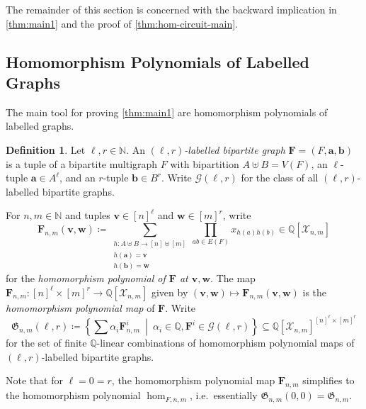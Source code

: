 \documentclass[11pt, DIV=15]{scrarticle}
\theoremstyle{definition}
\newtheorem{definition}{Definition}[section]
\theoremstyle{plain}
\theoremstyle{remark}
\begin{document}
	The remainder of this section is concerned with the backward implication in \cref{thm:main1} and the proof of \cref{thm:hom-circuit-main}.
	
	
	


	
	\subsection{Homomorphism Polynomials of Labelled Graphs}

	The main tool for proving \cref{thm:main1} are homomorphism polynomials of labelled graphs.
		
	\begin{definition}\label{def:labelled-hom-poly}
		Let $\ell, r \in \mathbb{N}$.
		An \emph{$(\ell, r)$-labelled bipartite graph} $\boldsymbol{F} = (F, \boldsymbol{a}, \boldsymbol{b})$ is a tuple of a bipartite multigraph $F$ with bipartition $A \uplus B = V(F)$,
		an $\ell$-tuple $\boldsymbol{a} \in A^\ell$, and an $r$-tuple $\boldsymbol{b} \in B^r$.
		Write $\mathcal{G}(\ell, r)$ for the class of all $(\ell, r)$-labelled bipartite graphs.
		
		For $n, m \in \mathbb{N}$ and tuples $\boldsymbol{v} \in [n]^\ell$ and $\boldsymbol{w} \in [m]^r$, write
		\[
		\boldsymbol{F}_{n,m}(\boldsymbol{v}, \boldsymbol{w}) \coloneqq \sum_{\substack{h \colon A \uplus B \to [n] \uplus [m]\\ h(\boldsymbol{a}) = \boldsymbol{v} \\ h(\boldsymbol{b}) = \boldsymbol{w}}} \prod_{ab \in E(F)} x_{h(a)h(b)} \in \mathbb{Q}[\mathcal{X}_{n,m}]
		\]
		for the \emph{homomorphism polynomial of $\boldsymbol{F}$ at $\boldsymbol{v},  \boldsymbol{w}$}.
		The map $\boldsymbol{F}_{n,m} \colon [n]^\ell \times [m]^r \to \mathbb{Q}[\mathcal{X}_{n,m}]$ given by $(\boldsymbol{v}, \boldsymbol{w}) \mapsto \boldsymbol{F}_{n,m}(\boldsymbol{v}, \boldsymbol{w})$ is the \emph{homomorphism polynomial map} of $\boldsymbol{F}$. Write
		\[
		\mathfrak{G}_{n,m}(\ell, r) \coloneqq \left\{\sum \alpha_i \boldsymbol{F}^i_{n,m} \ \middle|\  \alpha_i \in \mathbb{Q}, \boldsymbol{F}^i \in \mathcal{G}(\ell, r)\right\} \subseteq \mathbb{Q}[\mathcal{X}_{n,m}]^{[n]^\ell \times [m]^r}
		\]
		for the set of finite $\mathbb{Q}$-linear combinations of homomorphism polynomial maps of $(\ell,r)$-labelled bipartite graphs.
	\end{definition}

	Note that for $\ell = 0 = r$, the homomorphism polynomial map $\boldsymbol{F}_{n,m}$ simplifies to the homomorphism polynomial $\hom_{F, n, m}$, i.e.\ essentially $\mathfrak{G}_{n,m}(0,0) = \mathfrak{G}_{n,m}$. 
	
\end{document}
